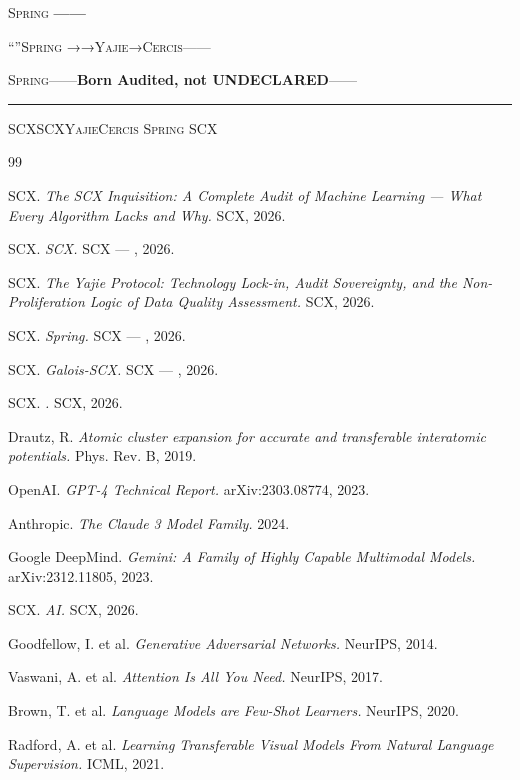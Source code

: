 \documentclass[12pt,a4paper]{article}
\theoremstyle{remark}
\newcommand{\Spring}{\textsc{Spring}}
\newcommand{\Yajie}{\textsc{Yajie}}
\newcommand{\Cercis}{\textsc{Cercis}}
\begin{document}
\Spring{}
\textbf{——}

“”\Spring{}
→→\Yajie{}→\Cercis{}——



\Spring{}——\textbf{Born Audited, not UNDECLARED}——


\vspace{12pt}
\noindent\rule{\textwidth}{0.4pt}
\vspace{6pt}

\noindent\textbf{}
SCXSCX\Yajie{}\Cercis{}
\Spring{}
SCX



% 
\begin{thebibliography}{99}

SCX. \textit{The SCX Inquisition: A Complete Audit of Machine Learning — What Every Algorithm Lacks and Why.}
SCX, 2026.

SCX. \textit{SCX.}
SCX — , 2026.

SCX. \textit{The Yajie Protocol: Technology Lock-in, Audit Sovereignty, and the Non-Proliferation Logic of Data Quality Assessment.}
SCX, 2026.

SCX. \textit{Spring.}
SCX — , 2026.

SCX. \textit{Galois-SCX.}
SCX — , 2026.

SCX. \textit{.}
SCX, 2026.

Drautz, R. \textit{Atomic cluster expansion for accurate and transferable interatomic potentials.}
Phys. Rev. B, 2019.

OpenAI. \textit{GPT-4 Technical Report.}
arXiv:2303.08774, 2023.

Anthropic. \textit{The Claude 3 Model Family.}
2024.

Google DeepMind. \textit{Gemini: A Family of Highly Capable Multimodal Models.}
arXiv:2312.11805, 2023.

SCX. \textit{AI.}
SCX, 2026.

Goodfellow, I. et al. \textit{Generative Adversarial Networks.}
NeurIPS, 2014.

Vaswani, A. et al. \textit{Attention Is All You Need.}
NeurIPS, 2017.

Brown, T. et al. \textit{Language Models are Few-Shot Learners.}
NeurIPS, 2020.

Radford, A. et al. \textit{Learning Transferable Visual Models From Natural Language Supervision.}
ICML, 2021.

\end{thebibliography}
\end{document}

